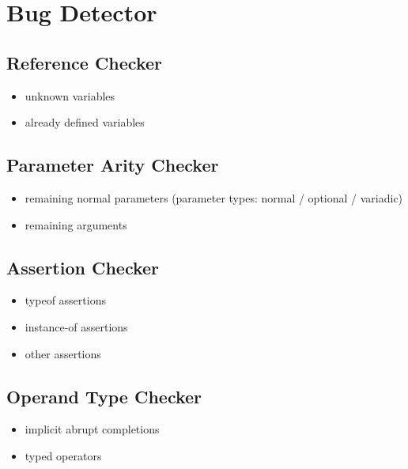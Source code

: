 \section{Bug Detector}\label{sec:checker}

\subsection{Reference Checker}
\begin{itemize}
  \item unknown variables
  \item already defined variables
\end{itemize}

\subsection{Parameter Arity Checker}
\begin{itemize}
  \item remaining normal parameters
    (parameter types: normal / optional / variadic)
  \item remaining arguments
\end{itemize}

\subsection{Assertion Checker}
\begin{itemize}
  \item typeof assertions
  \item instance-of assertions
  \item other assertions
\end{itemize}

\subsection{Operand Type Checker}
\begin{itemize}
  \item implicit abrupt completions
  \item typed operators
\end{itemize}
